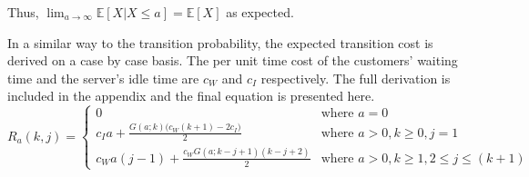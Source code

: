 Thus, $\displaystyle \lim_{a \to \infty} \mathbb{E} [X | X \leq a] = \mathbb{E} [X]$ as expected.

In a similar way to the transition probability, the expected transition cost is derived on a case by case basis. The per unit time cost of the customers' waiting time and the server's idle time are $c_{W}$ and $c_{I}$ respectively. The full derivation is included in the appendix and the final equation is presented here.
\begin{equation}
	R_{a} (k, j) = \begin{cases} 0 & \text{where $a = 0$} \\ c_{I} a + \frac{G (a; k) \big( c_{W} (k + 1) - 2 c_{I} \big)}{2} & \text{where $a > 0, k \geq 0, j = 1$} \\ c_{W} a (j - 1) + \frac{c_{W} G (a; k - j + 1) (k - j + 2)}{2} & \text{where $a > 0, k \geq 1, 2 \leq j \leq (k + 1)$} \end{cases}
\end{equation}




































